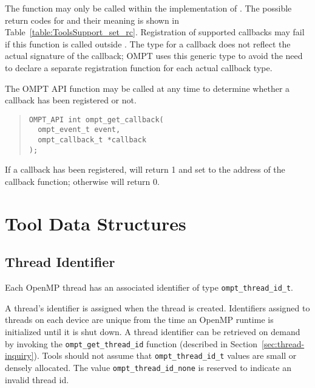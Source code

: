 \noindent
The  function  may only be called within the implementation of .
The possible return codes for  and their meaning is shown in Table~\ref{table:ToolsSupport_set_rc}.
Registration of supported callbacks may fail if this function is called outside  .
The  type for a callback does not reflect the actual signature of the callback; OMPT uses this generic type to avoid the need to declare a separate registration function for each actual callback type.

The OMPT API function  may be called at any time to determine whether a callback has been registered or not. 

\begin{quote}
\begin{verbatim}
OMPT_API int ompt_get_callback(
  ompt_event_t event, 
  ompt_callback_t *callback
);
\end{verbatim}
\end{quote}

\noindent
If a callback has been registered,  will return 1 and set  to the address of the callback function; otherwise  will return 0.



\section{Tool Data Structures}
\label{sec:data}

\subsection{Thread Identifier}
  Each OpenMP thread  has an associated identifier of type \verb|ompt_thread_id_t|. 
\begin{comment}
\begin{quote}
\begin{verbatim}
typedef uint64_t ompt_thread_id_t;
\end{verbatim}
\end{quote}
\end{comment}
  A thread's identifier is assigned when the thread is created. 
  Identifiers assigned to threads on each device are unique from the time an OpenMP runtime is initialized until it is shut down.
  A thread identifier can be retrieved
  on demand by invoking the  \verb|ompt_get_thread_id|   
  function (described in Section~\ref{sec:thread-inquiry}).
  Tools should not assume that \verb|ompt_thread_id_t| values are small or densely allocated. 
  The value \verb|ompt_thread_id_none| is reserved to indicate an invalid thread id.

